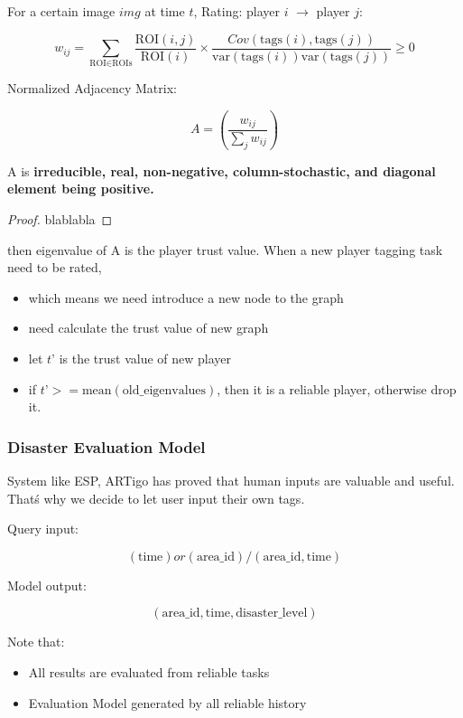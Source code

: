     For a certain image $img$ at time $t$, Rating: player $i$ $\rightarrow$ player $j$:

    \[
    w_{ij}=\sum_{\text{ROI}\in \text{ROIs}}\frac{\text{ROI}(i,j)}{\text{ROI}(i)} \times \frac{Cov(\text{tags}(i), \text{tags}(j))}{\text{var}(\text{tags}(i))\text{var}(\text{tags}(j))} \geq 0
    \]

    Normalized Adjacency Matrix:

    \[
    A = (\frac{w_{ij}}{\sum_{j}{w_{ij}}})
    \]

    
    \begin{theorem}
    A is \textbf{irreducible, real, non-negative, column-stochastic, and diagonal element being positive.}
    \end{theorem}

    \begin{proof}
    blablabla
    \end{proof}

    then eigenvalue of A is the player trust value. When a new player tagging task need to be rated,

    \begin{itemize}
      \item which means we need introduce a new node to the graph
      \item need calculate the trust value of new graph
      \item let $t’$ is the trust value of new player
      \item if $t’ >= \text{mean}(\text{old\_eigenvalues})$, then it is a reliable player, otherwise drop it.
    \end{itemize}

  \subsubsection{Disaster Evaluation Model}

    System like ESP, ARTigo has proved that human inputs are valuable and useful. That\'s why we decide to let user input
    their own tags.

    Query input:

    \[
    (\text{time}) or (\text{area\_id})/(\text{area\_id}, \text{time})
    \]

    Model output:

    \[
    (\text{area\_id}, \text{time}, \text{disaster\_level})
    \]

    Note that:

    \begin{itemize}
      \item All results are evaluated from reliable tasks
      \item Evaluation Model generated by all reliable history
    \end{itemize}

